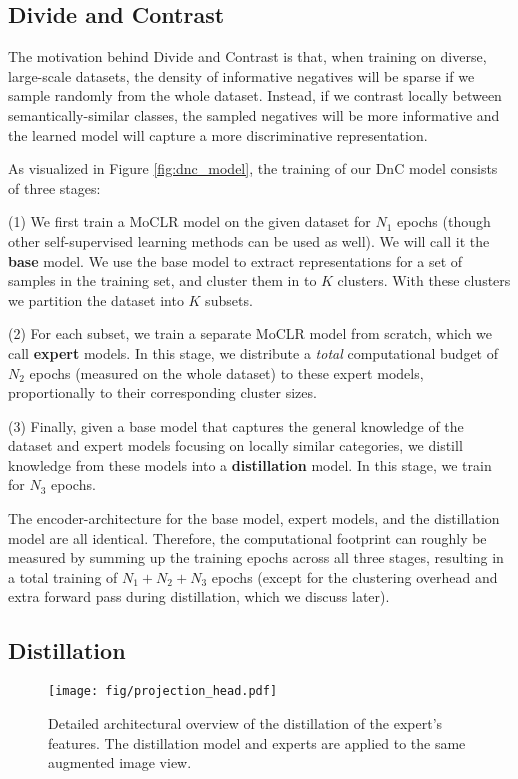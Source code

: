 \documentclass[final]{cvpr}
\newcommand\baseline{MoCLR}
\begin{document}
\subsection{Divide and Contrast}




The motivation behind Divide and Contrast is that, when training on diverse, large-scale datasets, the density of informative negatives will be sparse if we sample randomly from the whole dataset. Instead, if we contrast locally between semantically-similar classes, the sampled negatives will be more informative and the learned model will capture a more discriminative representation.

As visualized in Figure \ref{fig:dnc_model}, the training of our DnC model consists of three stages:

(1) We first train a \baseline{} model on the given dataset for $N_1$ epochs (though other self-supervised learning methods can be used as well). We will call it the \textbf{base} model. We use the base model to extract representations for a set of samples in the training set, and cluster them in to $K$ clusters. With these clusters we partition the dataset into $K$ subsets. 

(2) For each subset, we train a separate \baseline{} model from scratch, which we call \textbf{expert} models. In this stage, we distribute a \emph{total} computational budget of $N_2$ epochs (measured on the whole dataset) to these expert models, proportionally to their corresponding cluster sizes.

(3) Finally, given a base model that captures the general knowledge of the dataset and expert models focusing on locally similar categories, we distill knowledge from these models into a \textbf{distillation} model. In this stage, we train for $N_3$ epochs.

The encoder-architecture for the base model, expert models, and the distillation model are all identical. Therefore, the computational footprint can roughly be measured by summing up the training epochs across all three stages, resulting in a total training of $N_1+N_2+N_3$ epochs (except for the clustering overhead and extra forward pass during distillation, which we discuss later).

\subsection{Distillation}
\label{section:distill}

\begin{figure}[t]
  \centering
  \texttt{[image: fig/projection\_head.pdf]}
  \caption{Detailed architectural overview of the distillation of the expert's features. The distillation model and experts are applied to the same augmented image view.}\label{fig:distillation}
\end{figure}
\end{document}

